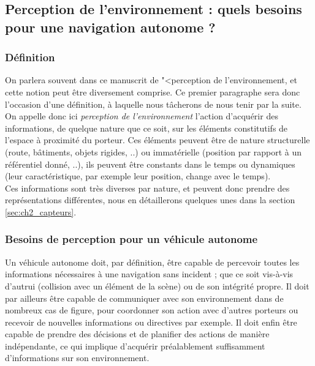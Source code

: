 \subsection{Perception de l'environnement : quels besoins pour une navigation autonome ?}
\subsubsection{Définition}
On parlera souvent dans ce manuscrit de "<perception de l'environnement\fg{}, et cette notion peut être diversement comprise. Ce premier paragraphe sera donc l'occasion d'une définition, à laquelle nous tâcherons de nous tenir par la suite. On appelle donc ici \emph{perception de l'environnement} l'action d'acquérir des informations, de quelque nature que ce soit, sur les éléments constitutifs de l'espace à proximité du porteur. Ces éléments peuvent être de nature structurelle (route, bâtiments, objets rigides, ..) ou immatérielle (position par rapport à un référentiel donné, ..), ils peuvent être constants dans le temps ou dynamiques (leur caractéristique, par exemple leur position, change avec le temps). \\
Ces informations sont très diverses par nature, et peuvent donc prendre des représentations différentes, nous en détaillerons quelques unes dans la section \ref{sec:ch2_capteurs}.

\subsubsection{Besoins de perception pour un véhicule autonome} \label{sec:ch1_besoins}
Un véhicule autonome doit, par définition, être capable de percevoir toutes les informations nécessaires à une navigation sans incident ; que ce soit vis-à-vis d'autrui (collision avec un élément de la scène) ou de son intégrité propre. Il doit par ailleurs être capable de communiquer avec son environnement dans de nombreux cas de figure, pour coordonner son action avec d'autres porteurs ou recevoir de nouvelles informations ou directives par exemple. Il doit enfin être capable de prendre des décisions et de planifier des actions de manière indépendante, ce qui implique d'acquérir préalablement suffisamment d'informations sur son environnement.\\


